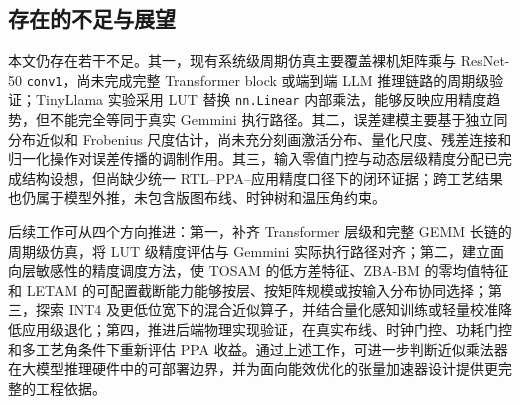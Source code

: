 \documentclass[12pt,a4paper,UTF8]{article}
\begin{document}
\subsection{存在的不足与展望}
本文仍存在若干不足。其一，现有系统级周期仿真主要覆盖裸机矩阵乘与 ResNet-50 \texttt{conv1}，尚未完成完整 Transformer block 或端到端 LLM 推理链路的周期级验证；TinyLlama 实验采用 LUT 替换 \texttt{nn.Linear} 内部乘法，能够反映应用精度趋势，但不能完全等同于真实 Gemmini 执行路径。其二，误差建模主要基于独立同分布近似和 Frobenius 尺度估计，尚未充分刻画激活分布、量化尺度、残差连接和归一化操作对误差传播的调制作用。其三，输入零值门控与动态层级精度分配已完成结构设想，但尚缺少统一 RTL--PPA--应用精度口径下的闭环证据；跨工艺结果也仍属于模型外推，未包含版图布线、时钟树和温压角约束。

后续工作可从四个方向推进：第一，补齐 Transformer 层级和完整 GEMM 长链的周期级仿真，将 LUT 级精度评估与 Gemmini 实际执行路径对齐；第二，建立面向层敏感性的精度调度方法，使 TOSAM 的低方差特征、ZBA-BM 的零均值特征和 LETAM 的可配置截断能力能够按层、按矩阵规模或按输入分布协同选择；第三，探索 INT4 及更低位宽下的混合近似算子，并结合量化感知训练或轻量校准降低应用级退化；第四，推进后端物理实现验证，在真实布线、时钟门控、功耗门控和多工艺角条件下重新评估 PPA 收益。通过上述工作，可进一步判断近似乘法器在大模型推理硬件中的可部署边界，并为面向能效优化的张量加速器设计提供更完整的工程依据。

\clearpage


\end{document}
